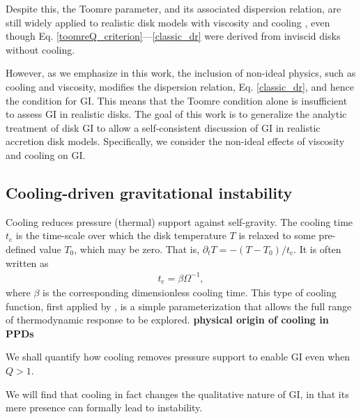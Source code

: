 \documentclass[iop, numberedappendix]{emulateapj}
\newcommand{\p}{\partial}
\newcommand{\tcool}{t_\mathrm{c}}
\begin{document}
Despite this, the Toomre parameter, and its associated
dispersion relation, are still widely applied to realistic disk models
with viscosity and cooling \citep[e.g.][]{cossins09, kimura12}, 
even though Eq. \ref{toomreQ_criterion}---\ref{classic_dr} were 
derived from inviscid disks without cooling. 

However, as we emphasize in this work, the inclusion of non-ideal
physics, such as cooling and viscosity, modifies the dispersion
relation, Eq. \ref{classic_dr}, and hence the condition for GI. This 
means that the Toomre condition alone is insufficient to assess GI
in realistic disks. The goal of this work is to generalize the
analytic treatment of disk GI to allow a self-consistent discussion of
GI in realistic accretion disk models. Specifically, we consider the non-ideal
effects of viscosity and cooling on GI. 


\subsection{Cooling-driven gravitational instability}
Cooling reduces pressure (thermal) support against self-gravity. The cooling time 
$\tcool$ is the time-scale over which the disk temperature $T$ is relaxed
to some pre-defined value $T_0$, which may be zero. That is, $\p_t T =
-(T-T_0)/\tcool$. It is often written as 
\begin{align} 
  \tcool = \beta \Omega^{-1},
\end{align}
where $\beta$ is the corresponding dimensionless cooling time. This
type of cooling function, first applied by \cite{gammie01}, is a
simple parameterization that allows the full range of thermodynamic
response to be explored. 
{\bf physical origin of cooling in PPDs}


We shall quantify how cooling removes pressure support to enable GI
even when $Q>1$.  





We will find that cooling in fact changes the 
qualitative nature of GI, in that its mere presence can
formally lead to instability.  
\end{document}

